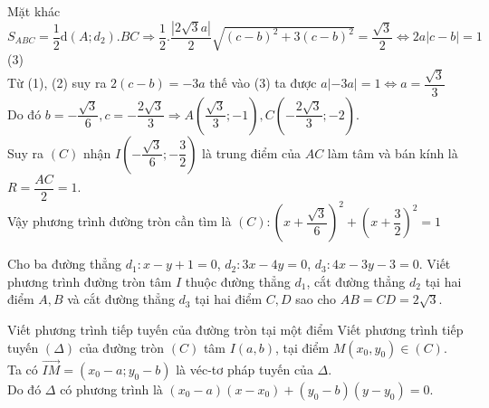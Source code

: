 \begin{bt}
{{			}
			Mặt khác $S_{ABC}=\dfrac{1}{2}\mathrm{d}\left(A;d_2\right).BC\Rightarrow \dfrac{1}{2}.\dfrac{\left| 2\sqrt{3}a\right|}{2}\sqrt{{{(c-b)}^{2}}+3{{(c-b)}^{2}}}=\dfrac{\sqrt{3}}{2} \Leftrightarrow 2a\left| c-b\right|=1$(3)\\
			Từ (1), (2) suy ra $2(c-b)=-3a$ thế vào (3) ta được $a\left|-3a\right|=1\Leftrightarrow a=\dfrac{\sqrt{3}}{3}$\\
			Do đó $b=-\dfrac{\sqrt{3}}{6},c=-\dfrac{2\sqrt{3}}{3}\Rightarrow $$A\left(\dfrac{\sqrt{3}}{3};-1\right),C\left(-\dfrac{2\sqrt{3}}{3};-2\right)$.\\
			Suy ra $(C)$ nhận $I\left(-\dfrac{\sqrt{3}}{6};-\dfrac{3}{2}\right)$ là trung điểm của $AC$ làm tâm và bán kính là $R=\dfrac{AC}{2}=1$.\\
			Vậy phương trình đường tròn cần tìm là $(C):\left(x+\dfrac{\sqrt{3}}{6}\right)^2+\left(x+\dfrac{3}{2}\right)^2= 1$
		}
	\end{bt}
	\begin{bt}%
		Cho ba đường thẳng $d_1:x-y+1=0$, $d_2:3x-4y=0$, $d_3:4x-3y-3=0$. Viết phương trình đường tròn tâm $I$ thuộc đường thẳng $d_1$, cắt đường thẳng $d_2$ tại hai điểm $A,B$ và cắt đường thẳng $d_3$ tại hai điểm $C,D$ sao cho $AB=CD=2\sqrt{3}$.
	\end{bt}
	


\begin{dang}{Viết phương trình tiếp tuyến của đường tròn tại một điểm}
	Viết phương trình tiếp tuyến $(\Delta)$ của đường tròn $(C)$ tâm $I(a,b)$, tại điểm $M(x_0,y_0) \in (C)$.
	\\ Ta có $\overrightarrow{IM}=(x_0-a;y_0-b)$ là véc-tơ pháp tuyến của $\Delta$.
	\\ Do đó $\Delta$ có phương trình là $(x_0-a)(x-x_0)+(y_0-b)(y-y_0)=0$.
	\\\begin{center}
	\end{center}	
	
\end{dang}

